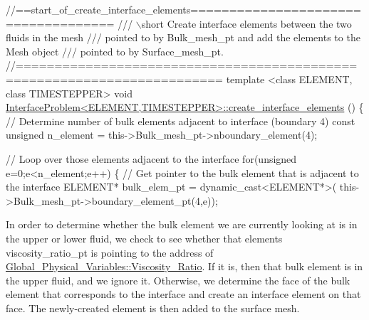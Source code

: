 \begin{DoxyCodeInclude}
\textcolor{comment}{//==start\_of\_create\_interface\_elements====================================}
\textcolor{comment}{/// \(\backslash\)short Create interface elements between the two fluids in the mesh}
\textcolor{comment}{}\textcolor{comment}{/// pointed to by Bulk\_mesh\_pt and add the elements to the Mesh object}
\textcolor{comment}{}\textcolor{comment}{/// pointed to by Surface\_mesh\_pt.}
\textcolor{comment}{}\textcolor{comment}{//========================================================================}
\textcolor{keyword}{template} <\textcolor{keyword}{class} ELEMENT, \textcolor{keyword}{class} TIMESTEPPER>
\textcolor{keywordtype}{void} \hyperlink{classInterfaceProblem_a94e2cc71fe27c0c329030874e05734b8}{InterfaceProblem<ELEMENT,TIMESTEPPER>::create\_interface\_elements}
      ()
\{
 \textcolor{comment}{// Determine number of bulk elements adjacent to interface (boundary 4)}
 \textcolor{keyword}{const} \textcolor{keywordtype}{unsigned} n\_element = this->Bulk\_mesh\_pt->nboundary\_element(4);
 
 \textcolor{comment}{// Loop over those elements adjacent to the interface}
 \textcolor{keywordflow}{for}(\textcolor{keywordtype}{unsigned} e=0;e<n\_element;e++)
  \{
   \textcolor{comment}{// Get pointer to the bulk element that is adjacent to the interface}
   ELEMENT* bulk\_elem\_pt = \textcolor{keyword}{dynamic\_cast<}ELEMENT*\textcolor{keyword}{>}(
    this->Bulk\_mesh\_pt->boundary\_element\_pt(4,e));

\end{DoxyCodeInclude}


In order to determine whether the bulk element we are currently looking at is in the upper or lower fluid, we check to see whether that element\textquotesingle{}s {\ttfamily viscosity\+\_\+ratio\+\_\+pt} is pointing to the address of {\ttfamily \hyperlink{namespaceGlobal__Physical__Variables_adb51428300a01b19395c43c0d3586d6f}{Global\+\_\+\+Physical\+\_\+\+Variables\+::\+Viscosity\+\_\+\+Ratio}}. If it is, then that bulk element is in the upper fluid, and we ignore it. Otherwise, we determine the face of the bulk element that corresponds to the interface and create an interface element on that face. The newly-\/created element is then added to the surface mesh.


